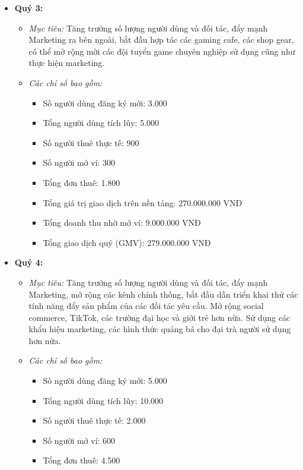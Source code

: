 \begin{itemize}
\begin{itemize}
\begin{itemize}
        \end{itemize}
    \end{itemize}
    \item \textbf{Quý 3:}
    \begin{itemize}
        \item \textit{Mục tiêu:} Tăng trưởng số lượng người dùng và đối tác, đẩy mạnh Marketing ra bên ngoài, bắt đầu hợp tác các gaming cafe, các shop gear, có thể mở rộng mời các đội tuyển game chuyên nghiệp sử dụng cũng như thực hiện marketing.
        \item \textit{Các chỉ số bao gồm:}
        \begin{itemize}
            \item Số người dùng đăng ký mới: 3.000
            \item Tổng người dùng tích lũy: 5.000
            \item Số người thuê thực tế: 900
            \item Số người mở ví: 300
            \item Tổng đơn thuê: 1.800
            \item Tổng giá trị giao dịch trên nền tảng: 270.000.000 VNĐ
            \item Tổng doanh thu nhờ mở ví: 9.000.000 VNĐ
            \item Tổng giao dịch quý (GMV): 279.000.000 VNĐ
        \end{itemize}
    \end{itemize}
    \item \textbf{Quý 4:}
    \begin{itemize}
        \item \textit{Mục tiêu:} Tăng trưởng số lượng người dùng và đối tác, đẩy mạnh Marketing, mở rộng các kênh chính thống, bắt đầu dần triển khai thử các tính năng đẩy sản phẩm của các đối tác yêu cầu. Mở rộng social commerce, TikTok, các trường đại học và giới trẻ hơn nữa. Sử dụng các khẩu hiệu marketing, các hình thức quảng bá cho đại trà người sử dụng hơn nữa.
        \item \textit{Các chỉ số bao gồm:}
        \begin{itemize}
            \item Số người dùng đăng ký mới: 5.000
            \item Tổng người dùng tích lũy: 10.000
            \item Số người thuê thực tế: 2.000
            \item Số người mở ví: 600
            \item Tổng đơn thuê: 4.500

\end{itemize}
\end{itemize}
\end{itemize}
